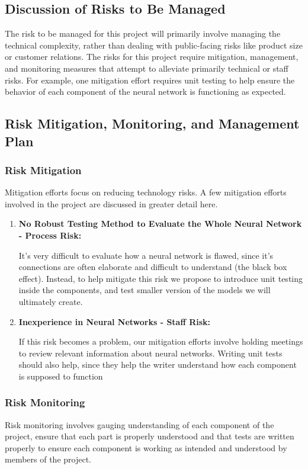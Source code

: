 \documentclass[english,12pt]{article}
\begin{document}
\subsection{Discussion of Risks to Be Managed}
The risk to be managed for this project will primarily involve managing the technical complexity,
rather than dealing with public-facing risks like product size or customer relations. The risks for 
this project require mitigation, management, and monitoring
 measures that attempt to alleviate primarily technical or staff risks. For example,
one mitigation effort requires unit testing to help ensure the behavior of each component
of the neural network is functioning as expected.
\subsection{Risk Mitigation, Monitoring, and Management Plan}
\subsubsection{Risk Mitigation}
Mitigation efforts focus on reducing technology risks. A few mitigation efforts
involved in the project are discussed in greater detail here.
\begin{enumerate}[1.]
  \item \textbf{No Robust Testing Method to Evaluate the Whole Neural Network - Process Risk:}

  It's very difficult to evaluate how a neural network is flawed, since it's connections
  are often elaborate and difficult to understand (the black box effect). Instead, to help mitigate this risk we propose to introduce unit testing inside the components, and test smaller version
  of the models we will ultimately create.

  \item \textbf{Inexperience in Neural Networks - Staff Risk:}

  If this risk becomes a problem, our mitigation efforts involve
  holding meetings to review relevant information about neural networks. 
  Writing unit tests should also help, since they help the writer understand
  how each component is supposed to function

\end{enumerate}
\subsubsection{Risk Monitoring}
Risk monitoring involves gauging understanding of each component of the project, ensure
that each part is properly understood and that tests are written properly to ensure each component
is working as intended and understood by members of the project.
\end{document}
